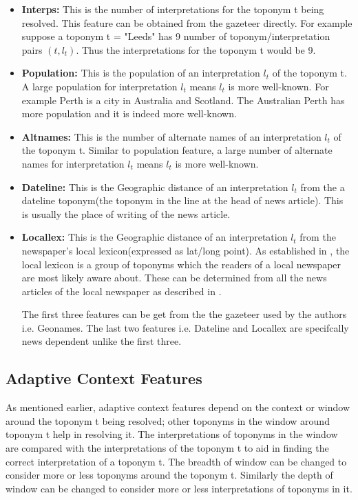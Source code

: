 \documentclass[
     11pt,         %
     a4paper,      %
     oneside,
     ]{article}
\begin{document}
\begin{itemize}[leftmargin=*]
	\item[] \textbf{Interps:} This is the number of interpretations for the toponym t being resolved. This feature can be obtained from the gazeteer directly. For example suppose a toponym t = "Leeds" has 9 number of toponym/interpretation pairs $(t, l_t)$. Thus the interpretations for the toponym t would be 9.
	\item[] \textbf{Population:} This is the population of an interpretation $l_t$ of the toponym t. A large population for interpretation $l_t$ means $l_t$ is more well-known. For example Perth is a city in Australia and Scotland. The Australian Perth has more population and it is indeed more well-known. 
	\item[] \textbf{Altnames:} This is the number of alternate names of an interpretation $l_t$ of the toponym t. Similar to population feature, a large number of alternate names for interpretation $l_t$ means $l_t$ is more well-known.  
	\item[] \textbf{Dateline:} This is the Geographic distance of an interpretation $l_t$ from the a dateline toponym(the toponym in the line at the head of news article). This is usually the place of writing of the news article. 
	\item[] \textbf{Locallex:} This is the Geographic distance of an interpretation $l_t$ from the newspaper's local lexicon(expressed as lat/long point). As established in \cite{lieberman2010geotagging}, the local lexicon is a group of toponyms which the readers of a local newspaper are most likely aware about. These can be determined from all the news articles of the local newspaper as described in \cite{lieberman2010geotagging}.  %
	
	
	The first three  features can be get from the the gazeteer used by the authors i.e. Geonames. The last two features i.e. Dateline and Locallex are specifcally news dependent unlike the first three. 
\end{itemize}

\subsection{Adaptive Context Features} 
As mentioned earlier, adaptive context features depend on the context or window around the toponym t being resolved; other toponyms in the window around toponym t help in resolving it. The interpretations of toponyms in the window are compared with the interpretations of the toponym t to aid in finding the correct interpretation of a toponym t. The breadth of window can be changed to consider more or less toponyms around the toponym t. Similarly the depth of window can be changed to consider more or less interpretations of toponyms in it. 
\end{document}
